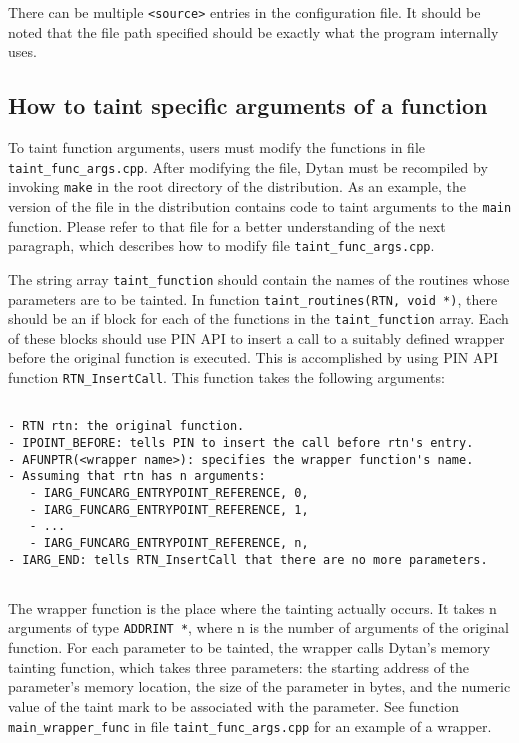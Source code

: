 \documentclass[letterpaper,10pt]{article}
\begin{document}
There can be multiple \verb|<source>| entries in the configuration file.
It should be noted that the file path specified should be exactly
what the program internally uses.

\subsection{How to taint specific arguments of a function}

To taint function arguments, users must modify the functions in file
\verb|taint_func_args.cpp|. After modifying the file, Dytan must be
recompiled by invoking \verb|make| in the root directory of the
distribution.  As an example, the version of the file in the
distribution contains code to taint arguments to the \verb|main| function.
Please refer to that file for a better understanding of the next
paragraph, which describes how to modify file \verb|taint_func_args.cpp|.

The string array \verb|taint_function| should contain the names of the
routines whose parameters are to be tainted. In function
\verb|taint_routines(RTN, void *)|, there should be an if block for each of
the functions in the \verb|taint_function| array. Each of these blocks
should use PIN API to insert a call to a suitably defined wrapper
before the original function is executed. This is accomplished by
using PIN API function \verb|RTN_InsertCall|. This function takes the
following arguments:

\begin{verbatim}

- RTN rtn: the original function.
- IPOINT_BEFORE: tells PIN to insert the call before rtn's entry.
- AFUNPTR(<wrapper name>): specifies the wrapper function's name.
- Assuming that rtn has n arguments:
   - IARG_FUNCARG_ENTRYPOINT_REFERENCE, 0,
   - IARG_FUNCARG_ENTRYPOINT_REFERENCE, 1,
   - ...
   - IARG_FUNCARG_ENTRYPOINT_REFERENCE, n,
- IARG_END: tells RTN_InsertCall that there are no more parameters.
 
\end{verbatim}

The wrapper function is the place where the tainting actually occurs.
It takes n arguments of type \verb|ADDRINT *|, where n is the number of
arguments of the original function. For each parameter to be tainted,
the wrapper calls Dytan's memory tainting function, which takes three
parameters: the starting address of the parameter's memory location,
the size of the parameter in bytes, and the numeric value of the taint
mark to be associated with the parameter.  See function
\verb|main_wrapper_func| in file \verb|taint_func_args.cpp| for an example of a
wrapper.
\end{document}
